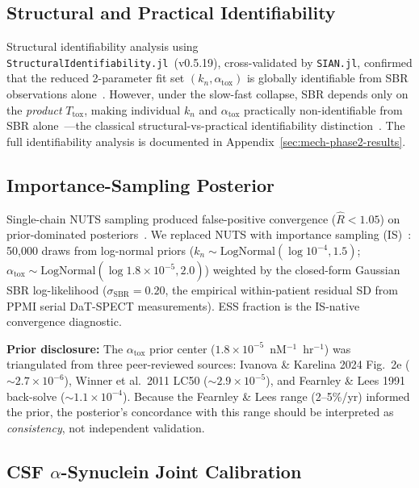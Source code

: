 \subsection{Structural and Practical Identifiability}

Structural identifiability analysis using \texttt{StructuralIdentifiability.jl}~(v0.5.19), cross-validated by \texttt{SIAN.jl}, confirmed that the reduced 2-parameter fit set $(k_n, \alpha_\text{tox})$ is globally identifiable from SBR observations alone~\cite{villaverde2016}. However, under the slow-fast collapse, SBR depends only on the \emph{product} $T_\text{tox}$, making individual $k_n$ and $\alpha_\text{tox}$ practically non-identifiable from SBR alone~\cite{gutenkunst2007,transtrum2015}---the classical structural-vs-practical identifiability distinction~\cite{raue2009}. The full identifiability analysis is documented in Appendix~\ref{sec:mech-phase2-results}.

\subsection{Importance-Sampling Posterior}

Single-chain NUTS sampling produced false-positive convergence ($\hat{R} < 1.05$) on prior-dominated posteriors~\cite{vehtari2021rhat}. We replaced NUTS with importance sampling (IS)~\cite{liu1998is}: 50,000 draws from log-normal priors ($k_n \sim \text{LogNormal}(\log 10^{-4}, 1.5)$; $\alpha_\text{tox} \sim \text{LogNormal}(\log 1.8\times10^{-5}, 2.0)$) weighted by the closed-form Gaussian SBR log-likelihood ($\sigma_\text{SBR} = 0.20$, the empirical within-patient residual SD from PPMI serial DaT-SPECT measurements). ESS fraction is the IS-native convergence diagnostic.

\textbf{Prior disclosure:} The $\alpha_\text{tox}$ prior center ($1.8 \times 10^{-5}$~nM$^{-1}$~hr$^{-1}$) was triangulated from three peer-reviewed sources: Ivanova \& Karelina 2024 Fig.~2e ($\sim 2.7 \times 10^{-6}$), Winner et al.\ 2011 LC50 ($\sim 2.9 \times 10^{-5}$), and Fearnley \& Lees 1991 back-solve ($\sim 1.1 \times 10^{-4}$). Because the Fearnley \& Lees range (2--5\%/yr) informed the prior, the posterior's concordance with this range should be interpreted as \emph{consistency}, not independent validation.

\subsection{CSF $\alpha$-Synuclein Joint Calibration}


